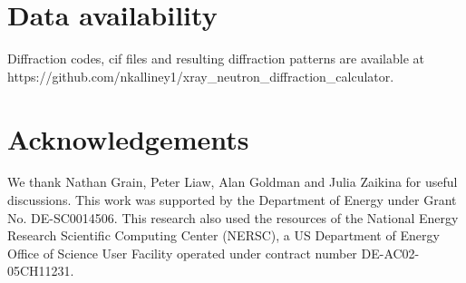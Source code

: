 \documentclass[twoside,12pt]{article}
\renewcommand{\refname}{Notes and references}
\begin{document}


\section*{Data availability}

Diffraction codes, cif files and resulting diffraction patterns are available at https://github.com/nkalliney1/xray\_neutron\_diffraction\_calculator.

\section*{Acknowledgements}
We thank Nathan Grain, Peter Liaw, Alan Goldman and Julia Zaikina for useful discussions. This work was supported by the Department of Energy under Grant No. DE-SC0014506. This research also used the resources of the National Energy Research Scientific Computing Center (NERSC), a US Department of Energy Office of Science User Facility operated under contract number DE-AC02-05CH11231.




\balance


\end{document}
